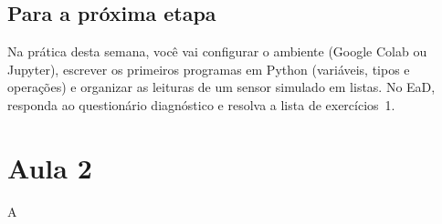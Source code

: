 \subsection{Para a próxima etapa}
 
Na prática desta semana, você vai configurar o ambiente (Google Colab ou Jupyter), escrever os primeiros programas em Python (variáveis, tipos e operações) e organizar as leituras de um sensor simulado em listas. No EaD, responda ao questionário diagnóstico e resolva a lista de exercícios~1.

\section{Aula 2}

A
